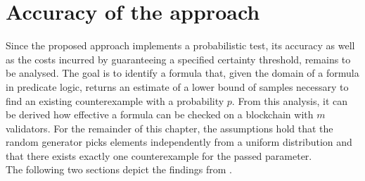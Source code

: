 \section{Accuracy of the approach}
Since the proposed approach implements a probabilistic test, its accuracy as well as the costs incurred by guaranteeing a specified certainty threshold, remains to be analysed. The goal is to identify a formula that, given the domain of a formula in predicate logic, returns an estimate of a lower bound of samples necessary to find an existing counterexample with a probability $p$. From this analysis, it can be derived how effective a formula can be checked on a blockchain with $m$ validators. For the remainder of this chapter, the assumptions hold that the random generator picks elements independently from a uniform distribution and that there exists exactly one counterexample for the passed parameter.\\
The following two sections depict the findings from \cite{bernhardt_veigel_2020}.

